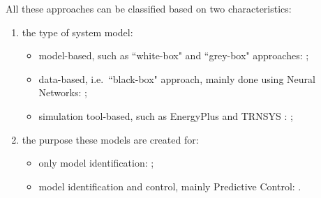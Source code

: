 \textcolor[rgb]{0,0,1}{
All these approaches can be classified based on two characteristics:
\begin{enumerate}
	\item the type of system model:
		\begin{itemize}
			\item model-based, such as ``white-box" and ``grey-box" approaches: \cite{Shakouri2017SCS,Li2014EB,Yoon2014EB,Li2016AE,Harb2016EB,Salakij2016EB,Li2016E,Li2016EB,Hou2013,Cecconi2017EB};
			\item data-based, i.e.~``black-box" approach, mainly done using Neural Networks: \cite{Safa2017SCS,Neto2008EB,Magnier2010BE,Candanedo2017EB,Ascione2017E,Cecconi2017EB,Li2016AE};
			\item simulation tool-based, such as EnergyPlus \cite{energyPlus} and TRNSYS \cite{trnsys2000}: \cite{Yin2016EB,Christantoni2016EB};
		\end{itemize}
	\item the purpose these models are created for:
		\begin{itemize}
			\item only model identification: \cite{Safa2017SCS,Neto2008EB,Magnier2010BE,Li2014EB,Li2016AE,Harb2016EB,Li2016EB,Candanedo2017EB,Cecconi2017EB,Ascione2017E};
			\item model identification and control, mainly Predictive Control: \cite{Shakouri2017SCS,Yoon2014EB,Yin2016EB,Salakij2016EB,Li2016E,Hu2017AE}.
		\end{itemize}
\end{enumerate}
}

